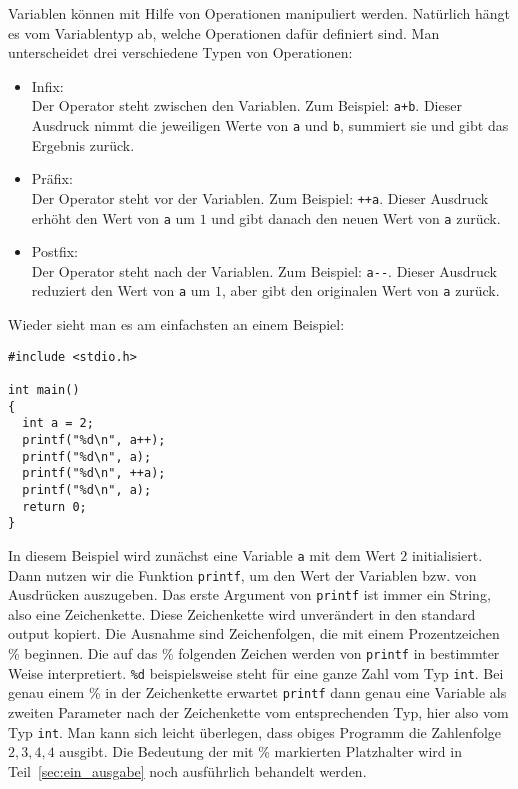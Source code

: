 Variablen können mit Hilfe von Operationen manipuliert werden.
Natürlich hängt es vom Variablentyp ab, welche Operationen dafür definiert sind.
Man unterscheidet drei verschiedene Typen von Operationen:
\begin{itemize}
\item Infix:\\
  Der Operator steht zwischen den Variablen. Zum Beispiel: \verb|a+b|. 
  Dieser Ausdruck nimmt die jeweiligen Werte von \verb|a| und \verb|b|, summiert sie und gibt das Ergebnis zurück.
\item Präfix:\\
  Der Operator steht vor der Variablen. Zum Beispiel: \verb|++a|. 
  Dieser Ausdruck erhöht den Wert von \verb|a| um $1$ und gibt danach den neuen Wert von \verb|a| zurück.
\item Postfix:\\
  Der Operator steht nach der Variablen. Zum Beispiel: \verb|a--|. 
  Dieser Ausdruck reduziert den Wert von \verb|a| um $1$, aber gibt den originalen Wert von \verb|a| zurück.
\end{itemize}
Wieder sieht man es am einfachsten an einem Beispiel:
\begin{lstlisting}
#include <stdio.h>

int main()
{
  int a = 2;
  printf("%d\n", a++);
  printf("%d\n", a);
  printf("%d\n", ++a);
  printf("%d\n", a);
  return 0;
}
\end{lstlisting}
In diesem Beispiel wird zunächst eine Variable \texttt{a} mit dem Wert $2$ initialisiert.\index{\texttt{++}}
Dann nutzen wir die Funktion \texttt{printf}, um den Wert der Variablen bzw. von Ausdrücken auszugeben. 
Das erste Argument von \texttt{printf} ist immer ein String, also eine Zeichenkette.
Diese Zeichenkette wird unverändert in den standard output kopiert.
Die Ausnahme sind Zeichenfolgen, die mit einem Prozentzeichen \% beginnen.
Die auf das \% folgenden Zeichen werden von \texttt{printf} in bestimmter Weise interpretiert.
\verb|%d| beispielsweise steht für eine ganze Zahl vom Typ \texttt{int}. 
Bei genau einem \% in der Zeichenkette erwartet \texttt{printf} dann genau eine Variable als zweiten Parameter nach der Zeichenkette vom entsprechenden Typ, hier also vom Typ \texttt{int}.
Man kann sich leicht überlegen, dass obiges Programm die Zahlenfolge $2,3,4,4$ ausgibt.
Die Bedeutung der mit \% markierten Platzhalter wird in Teil~\ref{sec:ein_ausgabe} noch ausführlich behandelt werden.

